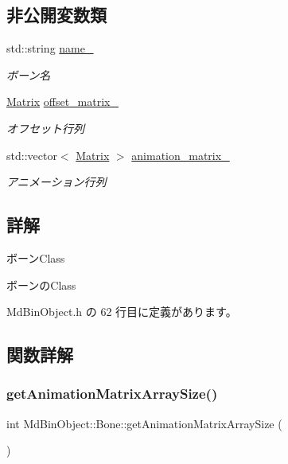 \subsection*{非公開変数類}
\begin{DoxyCompactItemize}
\item 
std\+::string \mbox{\hyperlink{class_md_bin_object_1_1_bone_ae9a47dcfa4c7f15e95b76a31846c9481}{name\+\_\+}}
\begin{DoxyCompactList}\small\item\em ボーン名 \end{DoxyCompactList}\item 
\mbox{\hyperlink{class_matrix}{Matrix}} \mbox{\hyperlink{class_md_bin_object_1_1_bone_a7ec2fdffbe14211b099c580c492f808a}{offset\+\_\+matrix\+\_\+}}
\begin{DoxyCompactList}\small\item\em オフセット行列 \end{DoxyCompactList}\item 
std\+::vector$<$ \mbox{\hyperlink{class_matrix}{Matrix}} $>$ \mbox{\hyperlink{class_md_bin_object_1_1_bone_a0b2968694781bca6852ce0675f69504a}{animation\+\_\+matrix\+\_\+}}
\begin{DoxyCompactList}\small\item\em アニメーション行列 \end{DoxyCompactList}\end{DoxyCompactItemize}


\subsection{詳解}
ボーン\+Class 

ボーンの\+Class 

 Md\+Bin\+Object.\+h の 62 行目に定義があります。



\subsection{関数詳解}
\mbox{\label{class_md_bin_object_1_1_bone_a66f24e8fb5fccdb6abcbbedca365ee4e}} 
\subsubsection{\texorpdfstring{get\+Animation\+Matrix\+Array\+Size()}{getAnimationMatrixArraySize()}}
{\footnotesize\ttfamily int Md\+Bin\+Object\+::\+Bone\+::get\+Animation\+Matrix\+Array\+Size (\begin{DoxyParamCaption}{ }\end{DoxyParamCaption})}



